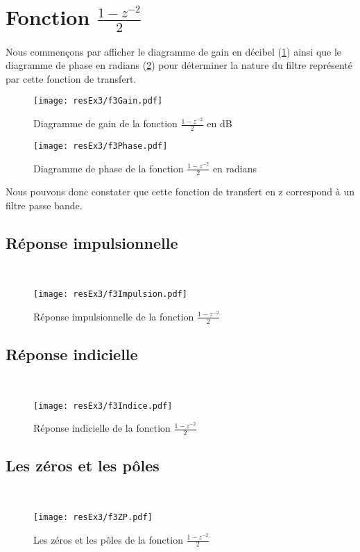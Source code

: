 \section{Fonction $\frac{1-z^{-2}}{2}$}
Nous commençons par afficher le diagramme de gain en décibel (\ref{f3 Diagramme de gain}) ainsi que le diagramme de phase en radians (\ref{f3 Diagramme de phase}) pour déterminer la nature du filtre représenté par cette fonction de transfert.
\begin{figure}[H]
\centering
\texttt{[image: resEx3/f3Gain.pdf]}
\caption{Diagramme de gain de la fonction $\frac{1-z^{-2}}{2}$ en dB}
\label{f3 Diagramme de gain}
\end{figure}
\begin{figure}[H]
\centering
\texttt{[image: resEx3/f3Phase.pdf]}
\caption{Diagramme de phase de la fonction $\frac{1-z^{-2}}{2}$ en radians}
\label{f3 Diagramme de phase}
\end{figure}
Nous pouvons donc constater que cette fonction de transfert en z correspond à un filtre passe bande.
\subsection{Réponse impulsionnelle}
~\\
\begin{figure}[H]
\centering
\texttt{[image: resEx3/f3Impulsion.pdf]}
\caption{Réponse impulsionnelle de la fonction $\frac{1-z^{-2}}{2}$ }
\end{figure}

\subsection{Réponse indicielle}
~\\
\begin{figure}[H]
\centering
\texttt{[image: resEx3/f3Indice.pdf]}
\caption{Réponse indicielle de la fonction $\frac{1-z^{-2}}{2}$ }
\end{figure}

\subsection{Les zéros et les pôles}
~\\
\begin{figure}[H]
\centering
\texttt{[image: resEx3/f3ZP.pdf]}
\caption{Les zéros et les pôles de la fonction $\frac{1-z^{-2}}{2}$ }
\end{figure}



